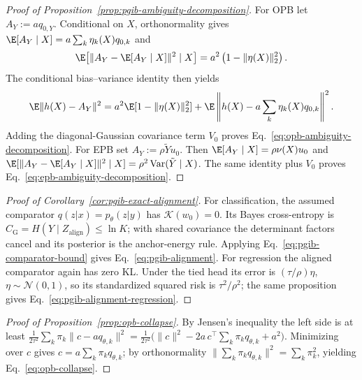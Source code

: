 \begin{proof}[Proof of Proposition~\ref{prop:pgib-ambiguity-decomposition}]
For OPB let $A_Y:=a q_{0,Y}$. Conditional on $X$, orthonormality gives
$\E[A_Y\mid X]=a\sum_k\eta_k(X)q_{0,k}$ and
\begin{equation*}
\E\!\left[\|A_Y-\E[A_Y\mid X]\|^2\mid X\right]
=a^2\left(1-\|\eta(X)\|_2^2\right).
\end{equation*}
The conditional bias--variance identity then yields
\begin{equation*}
\E\|h(X)-A_Y\|^2
=a^2\E[1-\|\eta(X)\|_2^2]
+\E\left\|h(X)-a\sum_k\eta_k(X)q_{0,k}\right\|^2.
\end{equation*}
Adding the diagonal-Gaussian covariance term $V_0$ proves
Eq.~\eqref{eq:opb-ambiguity-decomposition}. For EPB set
$A_Y:=\rho\tilde Y u_0$. Then
$\E[A_Y\mid X]=\rho\nu(X)u_0$ and
$\E[\|A_Y-\E[A_Y\mid X]\|^2\mid X]
=\rho^2\operatorname{Var}(\tilde Y\mid X)$. The same identity plus $V_0$ proves
Eq.~\eqref{eq:epb-ambiguity-decomposition}.
\end{proof}

\begin{proof}[Proof of Corollary~\ref{cor:pgib-exact-alignment}]
For classification, the assumed comparator $q(z|x)=p_\theta(z|y)$ has
$\mathcal K(w_0)=0$. Its Bayes cross-entropy is
$C_{\mathrm G}=H(Y\mid Z_{\mathrm{align}})\le\ln K$; with shared covariance the
determinant factors cancel and its posterior is the anchor-energy rule. Applying
Eq.~\eqref{eq:pgib-comparator-bound} gives Eq.~\eqref{eq:pgib-alignment}. For
regression the aligned comparator again has zero KL. Under the tied head its error is
$(\tau/\rho)\eta$, $\eta\sim\mathcal N(0,1)$, so its standardized squared risk is
$\tau^2/\rho^2$; the same proposition gives
Eq.~\eqref{eq:pgib-alignment-regression}.
\end{proof}

\begin{proof}[Proof of Proposition~\ref{prop:opb-collapse}]
By Jensen's inequality the left side is at least
$\tfrac{1}{2\tau^2}\sum_k \pi_k \|c - a q_{\theta,k}\|^2
= \tfrac{1}{2\tau^2}\bigl(\|c\|^2 - 2a\,c^{\top}\!\sum_k\pi_k q_{\theta,k} + a^2\bigr)$.
Minimizing over $c$ gives $c = a\sum_k\pi_k q_{\theta,k}$; by orthonormality
$\|\sum_k\pi_k q_{\theta,k}\|^2 = \sum_k \pi_k^2$, yielding Eq.~\eqref{eq:opb-collapse}.
\end{proof}


